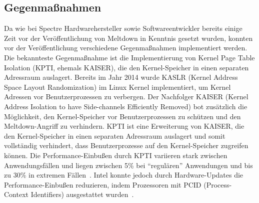\subsection{Gegenmaßnahmen}
\label{subsec:meltdown_gegenmassnahmen}
Da wie bei Spectre Hardwarehersteller sowie Softwareentwickler bereits einige Zeit vor der Veröffentlichung von Meltdown in Kenntnis gesetzt wurden, konnten vor der Veröffentlichung verschiedene Gegenmaßnahmen implementiert werden.
Die bekannteste Gegenmaßnahme ist die Implementierung von Kernel Page Table Isolation (KPTI, ehemals KAISER), die den Kernel-Speicher in einen separaten Adressraum auslagert.
Bereits im Jahr 2014 wurde KASLR (Kernel Address Space Layout Randomization) im Linux Kernel implementiert, um Kernel Adressen vor Benutzerprozessen zu verbergen.
Der Nachfolger KAISER (Kernel Address Isolation to have Side-channels Efficiently Removed) bot zusätzlich die Möglichkeit, den Kernel-Speicher vor Benutzerprozessen zu schützen und den Meltdown-Angriff zu verhindern.
KPTI ist eine Erweiterung von KAISER, die den Kernel-Speicher in einen separaten Adressraum auslagert und somit vollständig verhindert, dass Benutzerprozesse auf den Kernel-Speicher zugreifen können.
Die Performance-Einbußen durch KPTI variieren stark zwischen Anwendungsfällen und liegen zwischen 5\% bei \enquote{regulären} Anwendungen und bis zu 30\% in extremen Fällen~\cite{kaiser_2017}.
Intel konnte jedoch durch Hardware-Updates die Performance-Einbußen reduzieren, indem Prozessoren mit PCID (Process-Context Identifiers) ausgestattet wurden~\cite{pcworld_2018}.
